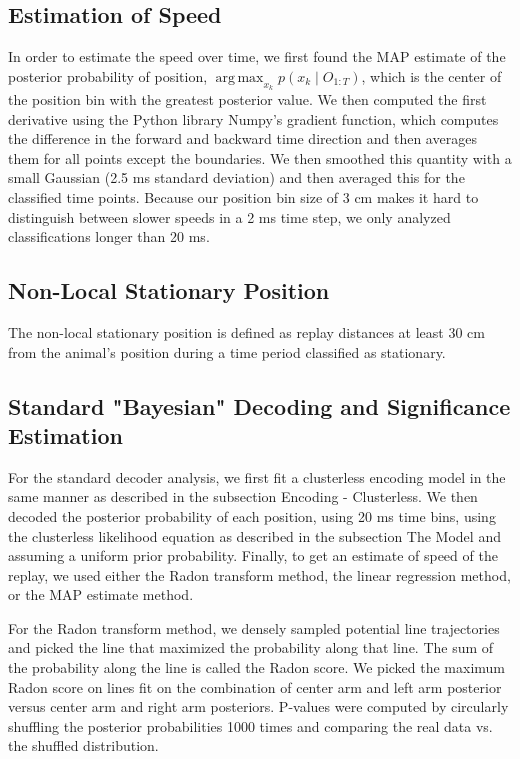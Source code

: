\documentclass[9pt,lineno]{elife}
\DeclareMathOperator*{\argmax}{arg\,max}
\begin{document}
\subsection*{Estimation of Speed}
In order to estimate the speed over time, we first found the MAP estimate of the posterior probability of position, $\argmax_{x_k} p(x_{k} \mid O_{1:T})$, which is the center of the position bin with the greatest posterior value. We then computed the first derivative using the Python library Numpy's gradient function, which computes the difference in the forward and backward time direction and then averages them for all points except the boundaries. We then smoothed this quantity with a small Gaussian (2.5 ms standard deviation) and then averaged this for the classified time points. Because our position bin size of 3 cm makes it hard to distinguish between slower speeds in a 2 ms time step, we only analyzed classifications longer than 20 ms.

\subsection*{Non-Local Stationary Position}
The non-local stationary position is defined as replay distances at least 30 cm from the animal's position during a time period classified as stationary.

\subsection*{Standard "Bayesian" Decoding and Significance Estimation}
For the standard decoder analysis, we first fit a clusterless encoding model in the same manner as described in the subsection Encoding - Clusterless. We then decoded the posterior probability of each position, using 20 ms time bins, using the clusterless likelihood equation as described in the subsection The Model and assuming a uniform prior probability. Finally, to get an estimate of speed of the replay, we used either the Radon transform method, the linear regression method, or the MAP estimate method.

For the Radon transform method, we densely sampled potential line trajectories and picked the line that maximized the probability along that line. The sum of the probability along the line is called the Radon score. We picked the maximum Radon score on lines fit on the combination of center arm and left arm posterior versus center arm and right arm posteriors. P-values were computed by circularly shuffling the posterior probabilities 1000 times and comparing the real data vs. the shuffled distribution.
\end{document}
